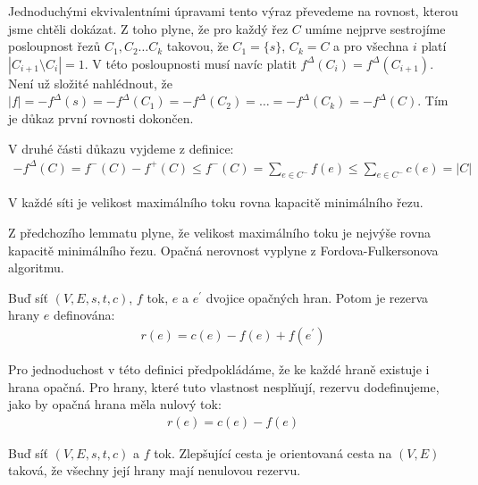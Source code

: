 \begin{t_proof}
  Jednoduchými ekvivalentními úpravami tento výraz převedeme na rovnost, kterou jsme chtěli dokázat. Z toho plyne, že pro každý řez $C$ umíme nejprve sestrojíme posloupnost řezů $C_1, C_2\dots C_k$ takovou, že $C_1=\{s\}$, $C_k=C$ a pro všechna $i$ platí $|C_{i+1}\setminus C_i|=1$. V této posloupnosti musí navíc platit $f^\Delta(C_i)=f^\Delta(C_{i+1})$. Není už složité nahlédnout, že $|f|=-f^\Delta(s)=-f^\Delta(C_1)=-f^\Delta(C_2)=\dots=-f^\Delta(C_k)=-f^\Delta(C)$. Tím je důkaz první rovnosti dokončen.
  
  V druhé části důkazu vyjdeme z definice:
  \begin{align*}
    -f^\Delta(C)=f^-(C)-f^+(C)\leq f^-(C)
    =\sum_{e\in C^-} f(e)\leq \sum_{e\in C^-} c(e)=|C|
  \end{align*}
\end{t_proof}

\begin{t_theorem}
  V každé síti je velikost maximálního toku rovna kapacitě minimálního řezu.
\end{t_theorem}

\begin{t_proof}
  Z předchozího lemmatu plyne, že velikost maximálního toku je nejvýše rovna kapacitě minimálního řezu. Opačná nerovnost vyplyne z Fordova-Fulkersonova algoritmu.
\end{t_proof}

\begin{t_definition}
  Buď síť $(V, E, s, t, c)$, $f$ tok, $e$ a $e^\prime$ dvojice opačných hran. Potom je rezerva hrany $e$ definována:
  \begin{align*}
    r(e)=c(e)-f(e)+f(e^\prime)
  \end{align*}
\end{t_definition}

\begin{t_remark}
  Pro jednoduchost v této definici předpokládáme, že ke každé hraně existuje i hrana opačná. Pro hrany, které tuto vlastnost nesplňují, rezervu dodefinujeme, jako by opačná hrana měla nulový tok:
  \begin{align*}
    r(e)=c(e)-f(e)
  \end{align*}
\end{t_remark}

\begin{t_definition}
  Buď síť $(V, E, s, t, c)$ a $f$ tok. Zlepšující cesta je orientovaná cesta na $(V,E)$ taková, že všechny její hrany mají nenulovou rezervu.
\end{t_definition}

